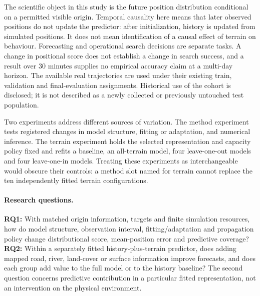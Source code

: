 \documentclass[11pt]{article}
\begin{document}
The scientific object in this study is the future position distribution
conditional on a permitted visible origin. Temporal causality here means
that later observed positions do not update the predictor: after initialization,
history is updated from simulated positions. It does not mean identification
of a causal effect of terrain on behaviour. Forecasting and operational search
decisions are separate tasks. A change in positional score does not establish
a change in search success, and a result over 30 minutes supplies no empirical
accuracy claim at a multi-day horizon. The available real trajectories are
used under their existing train, validation and final-evaluation assignments.
Historical use of the cohort is disclosed; it is not described as a newly
collected or previously untouched test population.

Two experiments address different sources of variation. The method experiment
tests registered changes in model structure, fitting or adaptation, and
numerical inference. The terrain experiment holds the selected representation
and capacity policy fixed and refits a baseline, an all-terrain model, four
leave-one-out models and four leave-one-in models. Treating these experiments
as interchangeable would obscure their controls: a method slot named for
terrain cannot replace the ten independently fitted terrain configurations.

\paragraph{Research questions.}
\label{sec:research-questions}
\textbf{RQ1:} With matched origin information, targets and finite simulation
resources, how do model structure, observation interval, fitting/adaptation
and propagation policy change distributional score, mean-position error and
predictive coverage?
\textbf{RQ2:} Within a separately fitted history-plus-terrain predictor, does
adding mapped road, river, land-cover or surface information improve forecasts,
and does each group add value to the full model or to the history baseline?
The second question concerns predictive contribution in a particular fitted
representation, not an intervention on the physical environment.
\end{document}
